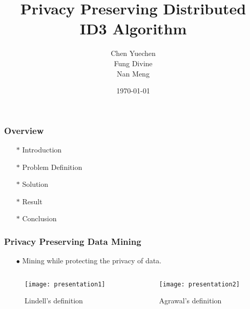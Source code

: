 \documentclass[xcolor=table]{beamer}
\title[Two-party Jointly Decision Tree]{Privacy Preserving Distributed ID3 Algorithm} %
\author{Chen Yuechen \\ Fung Divine \\ Nan Meng} %
\date{\today} %
\begin{document}
\begin{frame}
	\titlepage %
\end{frame}

\begin{frame}
\frametitle{Overview} %

\begin{itemize} \itemsep16pt \parskip0pt 
  \item[$\ast$] Introduction
  \item[$\ast$] Problem Definition
  \item[$\ast$] Solution
  \item[$\ast$] Result
  \item[$\ast$] Conclusion
\end{itemize}
\end{frame}

\begin{frame}
\frametitle{Privacy Preserving Data Mining}

\begin{itemize} \itemsep16pt \parskip0pt 
  \item[$\bullet$] Mining while protecting the privacy of data.
\end{itemize}

\begin{columns}
\begin{column}{6cm}
\begin{figure}[H]
  \caption{Lindell’s definition}
  \centering
  \texttt{[image: presentation1]}
  \label{Angelinatree}
\end{figure}
\end{column}


\begin{column}{6cm}
\begin{figure}[H]
  \caption{Agrawal’s definition}
  \centering
  \texttt{[image: presentation2]}
  \label{Angelinatree}
\end{figure}
\end{column}
\end{columns}
\end{frame}
\end{document}
